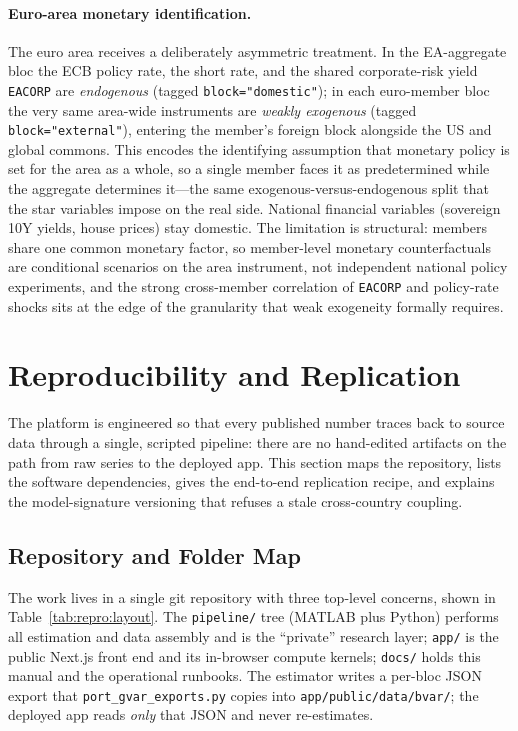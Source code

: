 \documentclass[11pt]{article}
\theoremstyle{definition}
\theoremstyle{remark}
\begin{document}
\paragraph{Euro-area monetary identification.}
The euro area receives a deliberately asymmetric treatment. In the EA-aggregate
bloc the ECB policy rate, the short rate, and the shared corporate-risk yield
\texttt{EACORP} are \emph{endogenous} (tagged \texttt{block="domestic"}); in
each euro-member bloc the very same area-wide instruments are
\emph{weakly exogenous} (tagged \texttt{block="external"}), entering the
member's foreign block alongside the US and global commons. This encodes the
identifying assumption that monetary policy is set for the area as a whole, so a
single member faces it as predetermined while the aggregate determines it---the
same exogenous-versus-endogenous split that the star variables impose on the
real side. National financial variables (sovereign 10Y yields, house prices)
stay domestic. The limitation is structural: members share one common monetary
factor, so member-level monetary counterfactuals are conditional scenarios on
the area instrument, not independent national policy experiments, and the strong
cross-member correlation of \texttt{EACORP} and policy-rate shocks sits at the
edge of the granularity that weak exogeneity formally requires.

\section{Reproducibility and Replication}\label{sec:repro}

The platform is engineered so that every published number traces back to
source data through a single, scripted pipeline: there are no hand-edited
artifacts on the path from raw series to the deployed app. This section maps
the repository, lists the software dependencies, gives the end-to-end
replication recipe, and explains the model-signature versioning that refuses a
stale cross-country coupling.

\subsection{Repository and Folder Map}\label{sec:repro:repo}

The work lives in a single git repository with three top-level concerns, shown
in Table~\ref{tab:repro:layout}. The \texttt{pipeline/} tree (MATLAB plus
Python) performs all estimation and data assembly and is the ``private''
research layer; \texttt{app/} is the public Next.js front end and its
in-browser compute kernels; \texttt{docs/} holds this manual and the
operational runbooks. The estimator writes a per-bloc JSON export that
\texttt{port\_gvar\_exports.py} copies into \texttt{app/public/data/bvar/}; the
deployed app reads \emph{only} that JSON and never re-estimates.
\end{document}
